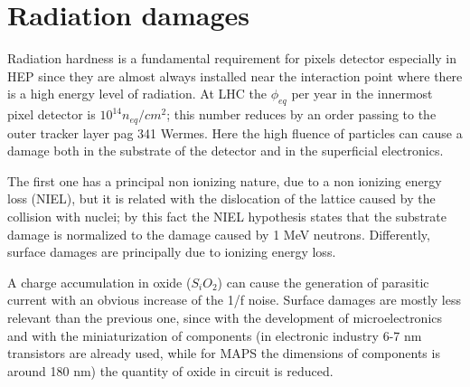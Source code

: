 \label{Appendix:pixels_overview}
\section{Radiation damages}
    Radiation hardness is a fundamental requirement for pixels detector especially in HEP since they are almost always installed near the interaction point where there is a high energy level of radiation. At LHC the $\phi_{eq}$ per year in the innermost pixel detector is $10^{14} n_{eq}/cm^2$; this number reduces by an order passing to the outer tracker layer \cite{K-Wermes} pag 341 Wermes. Here the high fluence of particles can cause a damage both in the substrate of the detector and in the superficial electronics. 
    
    The first one has a principal non ionizing nature, due to a non ionizing energy loss (NIEL), but it is related with the dislocation of the lattice caused by the collision with nuclei; by this fact the NIEL hypothesis states that the substrate damage is normalized to the damage caused by 1 MeV neutrons. Differently, surface damages are principally due to ionizing energy loss.

    A charge accumulation in oxide ($S_iO_2$) can cause the generation of parasitic current with an obvious increase of the 1/f noise. Surface damages are mostly less relevant than the previous one, since with the development of microelectronics and with the miniaturization of components (in electronic industry 6-7 nm transistors are already used, while for MAPS the dimensions of components is around 180 nm) the quantity of oxide in circuit is reduced.

